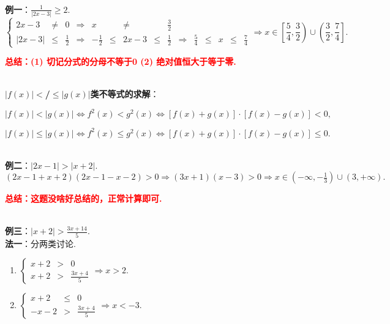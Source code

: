 \documentclass[8pt]{article}
\begin{document}
				~\\

				\textbf{例一}：$\displaystyle \frac{1}{|2x-3|}\geq2.$
					~\\

					$$
					\left\{
					\begin{array}{rclcrccclcrcccl}
					2x-3&\neq&0&\Rightarrow&x&&\neq&&\frac{3}{2}\\
					|2x-3|&\leq&\frac{1}{2}&\Rightarrow&-\frac{1}{2}&\leq&2x-3&\leq&\frac{1}{2}&\Rightarrow&\frac{5}{4}&\leq&x&\leq&\frac{7}{4}
					\end{array}
					\right.
					\Rightarrow x\in\displaystyle\left[\frac{5}{4}, \frac{3}{2}\right)\cup\left(\frac{3}{2}, \frac{7}{4}\right].
					$$

					\textcolor{red}{\textbf{总结：(1) 切记分式的分母不等于0 (2) 绝对值恒大于等于零.}}

				~\\

				\textbf{$|f(x)|$$<$/$\leq$$|g(x)|$类不等式的求解}：

				$$|f(x)|<|g(x)| \Leftrightarrow f^2(x)<g^2(x) \Leftrightarrow [f(x)+g(x)]\cdot[f(x)-g(x)]<0,$$

				$$|f(x)|\leq|g(x)| \Leftrightarrow f^2(x)\leq g^2(x) \Leftrightarrow [f(x)+g(x)]\cdot[f(x)-g(x)]\leq 0.$$

				~\\

				\textbf{例二}：$|2x-1|>|x+2|.$
					~\\

					$\displaystyle (2x-1+x+2)(2x-1-x-2)>0\Rightarrow (3x+1)(x-3)>0 \Rightarrow x\in \left(-\infty, -\frac{1}{3}\right)\cup(3, +\infty).$

					\textcolor{red}{\textbf{总结：这题没啥好总结的，正常计算即可.}}

				~\\

				\textbf{例三}：$\displaystyle |x+2|>\frac{3x+14}{5}.$
					~\\

					\textbf{法一}：分两类讨论.

					\begin{enumerate}[label=$\arabic*^{\circ}$]
						\item $\left\{\begin{array}{rcl}x+2&>&0\\x+2&>&\displaystyle\frac{3x+4}{5}\end{array}\right.\Rightarrow x>2.$
						\item $\left\{\begin{array}{rcl}x+2&\leq&0\\-x-2&>&\displaystyle\frac{3x+4}{5}\end{array}\right.\Rightarrow x<-3.$
					\end{enumerate}
\end{document}
